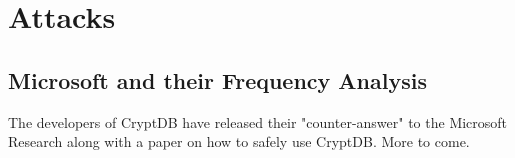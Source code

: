 \chapter{Attacks}
\label{chp:attacks}

\section{Microsoft and their Frequency Analysis}

The developers of CryptDB have released their "counter-answer" to the Microsoft Research along with a paper on how to safely use CryptDB. More to come.